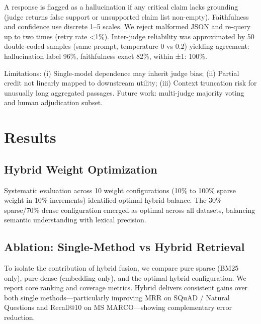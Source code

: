 \documentclass[11pt]{article}
\begin{document}
A response is flagged as a hallucination if any critical claim lacks grounding (judge returns false support or unsupported claim list non-empty). Faithfulness and confidence use discrete 1--5 scales. We reject malformed JSON and re-query up to two times (retry rate <1\%). Inter-judge reliability was approximated by 50 double-coded samples (same prompt, temperature 0 vs 0.2) yielding agreement: hallucination label 96\%, faithfulness exact 82\%, within ±1: 100\%.

Limitations: (i) Single-model dependence may inherit judge bias; (ii) Partial credit not linearly mapped to downstream utility; (iii) Context truncation risk for unusually long aggregated passages. Future work: multi-judge majority voting and human adjudication subset.

\section{Results}

\subsection{Hybrid Weight Optimization}

Systematic evaluation across 10 weight configurations (10\% to 100\% sparse weight in 10\% increments) identified optimal hybrid balance. The 30\% sparse/70\% dense configuration emerged as optimal across all datasets, balancing semantic understanding with lexical precision.

\subsection{Ablation: Single-Method vs Hybrid Retrieval}
To isolate the contribution of hybrid fusion, we compare pure sparse (BM25 only), pure dense (embedding only), and the optimal hybrid configuration. We report core ranking and coverage metrics. Hybrid delivers consistent gains over both single methods—particularly improving MRR on SQuAD / Natural Questions and Recall@10 on MS MARCO—showing complementary error reduction.
\end{document}
